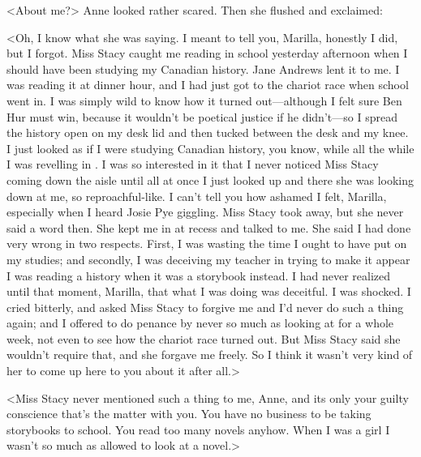 <About me?> Anne looked rather scared. Then she flushed and exclaimed:

<Oh, I know what she was saying. I meant to tell you, Marilla, honestly I did, but I forgot. Miss Stacy caught me reading  in school yesterday afternoon when I should have been studying my Canadian history. Jane Andrews lent it to me. I was reading it at dinner hour, and I had just got to the chariot race when school went in. I was simply wild to know how it turned out—although I felt sure Ben Hur must win, because it wouldn't be poetical justice if he didn't—so I spread the history open on my desk lid and then tucked  between the desk and my knee. I just looked as if I were studying Canadian history, you know, while all the while I was revelling in . I was so interested in it that I never noticed Miss Stacy coming down the aisle until all at once I just looked up and there she was looking down at me, so reproachful-like. I can't tell you how ashamed I felt, Marilla, especially when I heard Josie Pye giggling. Miss Stacy took  away, but she never said a word then. She kept me in at recess and talked to me. She said I had done very wrong in two respects. First, I was wasting the time I ought to have put on my studies; and secondly, I was deceiving my teacher in trying to make it appear I was reading a history when it was a storybook instead. I had never realized until that moment, Marilla, that what I was doing was deceitful. I was shocked. I cried bitterly, and asked Miss Stacy to forgive me and I'd never do such a thing again; and I offered to do penance by never so much as looking at  for a whole week, not even to see how the chariot race turned out. But Miss Stacy said she wouldn't require that, and she forgave me freely. So I think it wasn't very kind of her to come up here to you about it after all.>

<Miss Stacy never mentioned such a thing to me, Anne, and its only your guilty conscience that's the matter with you. You have no business to be taking storybooks to school. You read too many novels anyhow. When I was a girl I wasn't so much as allowed to look at a novel.>


